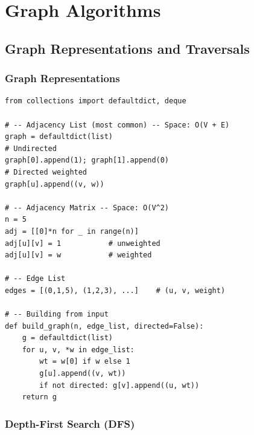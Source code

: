 \documentclass[11pt,a4paper]{report}
\begin{document}
\part{Graph Algorithms}

\chapter{Graph Representations and Traversals}

\section{Graph Representations}

\begin{lstlisting}
from collections import defaultdict, deque

# -- Adjacency List (most common) -- Space: O(V + E)
graph = defaultdict(list)
# Undirected
graph[0].append(1); graph[1].append(0)
# Directed weighted
graph[u].append((v, w))

# -- Adjacency Matrix -- Space: O(V^2)
n = 5
adj = [[0]*n for _ in range(n)]
adj[u][v] = 1           # unweighted
adj[u][v] = w           # weighted

# -- Edge List
edges = [(0,1,5), (1,2,3), ...]    # (u, v, weight)

# -- Building from input
def build_graph(n, edge_list, directed=False):
    g = defaultdict(list)
    for u, v, *w in edge_list:
        wt = w[0] if w else 1
        g[u].append((v, wt))
        if not directed: g[v].append((u, wt))
    return g
\end{lstlisting}

\section{Depth-First Search (DFS)}
\end{document}

